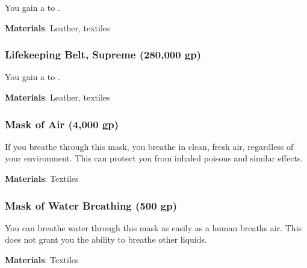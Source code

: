 You gain a   to .



\vspace{0.25em}
\textbf{Materials}: Leather, textiles


\lowercase{\hypertarget{item:Lifekeeping Belt, Supreme}{}}\label{item:Lifekeeping Belt, Supreme}
\hypertarget{item:Lifekeeping Belt, Supreme}{\subsubsection{Lifekeeping Belt, Supreme\hfill{} (280,000 gp)}}

You gain a   to .



\vspace{0.25em}
\textbf{Materials}: Leather, textiles


\lowercase{\hypertarget{item:Mask of Air}{}}\label{item:Mask of Air}
\hypertarget{item:Mask of Air}{\subsubsection{Mask of Air\hfill{} (4,000 gp)}}

If you breathe through this mask, you breathe in clean, fresh air, regardless of your environment.
This can protect you from inhaled poisons and similar effects.



\vspace{0.25em}
\textbf{Materials}: Textiles


\lowercase{\hypertarget{item:Mask of Water Breathing}{}}\label{item:Mask of Water Breathing}
\hypertarget{item:Mask of Water Breathing}{\subsubsection{Mask of Water Breathing\hfill{} (500 gp)}}

You can breathe water through this mask as easily as a human breaths air.
This does not grant you the ability to breathe other liquids.



\vspace{0.25em}
\textbf{Materials}: Textiles


